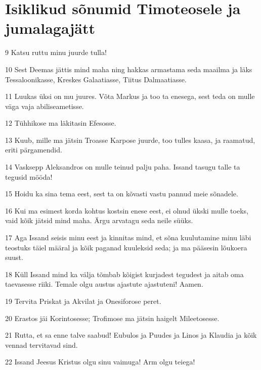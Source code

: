 \section*{Isiklikud sõnumid Timoteosele ja jumalagajätt}

\par 9 Katsu ruttu minu juurde tulla!
\par 10 Sest Deemas jättis mind maha ning hakkas armastama seda maailma ja läks Tessaloonikasse, Kreskes Galaatiasse, Tiitus Dalmaatiasse.
\par 11 Luukas üksi on mu juures. Võta Markus ja too ta enesega, sest teda on mulle väga vaja abiliseametisse.
\par 12 Tühhikose ma läkitasin Efesosse.
\par 13 Kuub, mille ma jätsin Troasse Karpose juurde, too tulles kaasa, ja raamatud, eriti pärgamendid.
\par 14 Vasksepp Aleksandros on mulle teinud palju paha. Issand tasugu talle ta tegusid mööda!
\par 15 Hoidu ka sina tema eest, sest ta on kõvasti vastu pannud meie sõnadele.
\par 16 Kui ma esimest korda kohtus kostsin enese eest, ei olnud ükski mulle toeks, vaid kõik jätsid mind maha. Ärgu arvatagu seda neile süüks.
\par 17 Aga Issand seisis minu eest ja kinnitas mind, et sõna kuulutamine minu läbi teostuks täiel määral ja kõik paganad kuuleksid seda; ja ma pääsesin lõukoera suust.
\par 18 Küll Issand mind ka välja tõmbab kõigist kurjadest tegudest ja aitab oma taevasesse riiki. Temale olgu austus ajastute ajastuteni! Aamen.
\par 19 Tervita Priskat ja Akvilat ja Onesiforose peret.
\par 20 Erastos jäi Korintosesse; Trofimose ma jätsin haigelt Mileetosesse.
\par 21 Rutta, et sa enne talve saabud! Eubulos ja Puudes ja Linos ja Klaudia ja kõik vennad tervitavad sind.
\par 22 Issand Jeesus Kristus olgu sinu vaimuga! Arm olgu teiega!





